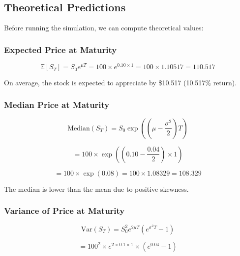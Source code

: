 \documentclass[12pt,a4paper]{article}
\begin{document}
\subsection{Theoretical Predictions}

Before running the simulation, we can compute theoretical values:

\subsubsection{Expected Price at Maturity}

\begin{equation}
\mathbb{E}[S_T] = S_0 e^{\mu T} = 100 \times e^{0.10 \times 1} = 100 \times 1.10517 = 110.517
\end{equation}

On average, the stock is expected to appreciate by \$10.517 (10.517\% return).

\subsubsection{Median Price at Maturity}

\begin{equation}
\text{Median}(S_T) = S_0 \exp\left(\left(\mu - \frac{\sigma^2}{2}\right)T\right)
\end{equation}

\begin{equation}
= 100 \times \exp\left(\left(0.10 - \frac{0.04}{2}\right) \times 1\right)
\end{equation}

\begin{equation}
= 100 \times \exp(0.08) = 100 \times 1.08329 = 108.329
\end{equation}

The median is lower than the mean due to positive skewness.

\subsubsection{Variance of Price at Maturity}

\begin{equation}
\text{Var}(S_T) = S_0^2 e^{2\mu T} (e^{\sigma^2 T} - 1)
\end{equation}

\begin{equation}
= 100^2 \times e^{2 \times 0.1 \times 1} \times (e^{0.04} - 1)
\end{equation}
\end{document}
